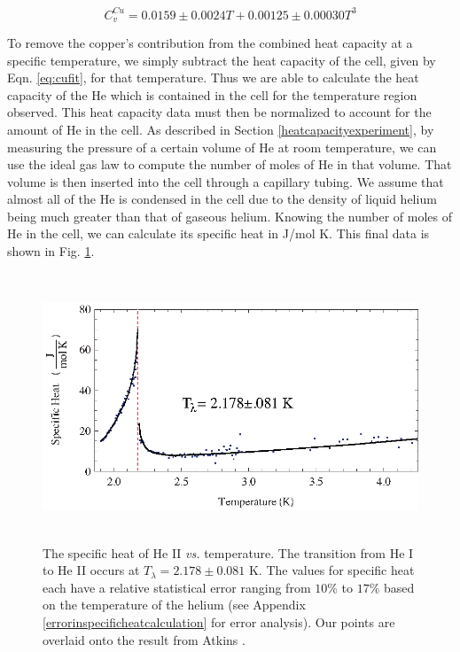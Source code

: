 \begin{center}
\begin{equation}\label{eq:cufit}
C^{Cu}_{v} = 0.0159\pm0.0024 T+ 0.00125\pm0.00030 T^{3} 
\end{equation}
\end{center}

To remove the copper's contribution from the combined heat capacity at a specific temperature, we simply subtract the heat capacity of the cell, given by Eqn. \ref{eq:cufit}, for that temperature. Thus we are able to calculate the heat capacity of the He which is contained in the cell for the temperature region observed.  This heat capacity data must then be normalized to account for the amount of He in the cell. As described in Section \ref{heatcapacityexperiment}, by measuring the pressure of a certain volume of He at room temperature, we can use the ideal gas law to compute the number of moles of He in that volume.  That volume is then inserted into the cell through a capillary tubing.  We assume that almost all of the He is condensed in the cell due to the density of liquid helium being much greater than that of gaseous helium.  Knowing the number of moles of He in the cell, we can calculate its specific heat in J/mol K. This final data is shown in Fig. \ref{fig:lambdatrans}.

\begin{figure}[htbp]
\begin{center}
\includegraphics[height=80mm]{./figures/lambdatrans.eps}
\caption{\small{The specific heat of He II \emph{vs.} temperature. The transition from He I to He II occurs at $T_{\lambda} = 2.178 \pm 0.081$ K.  The values for specific heat each have a relative statistical error ranging from $10\%$  to $17\%$ based on the temperature of the helium (see Appendix \ref{errorinspecificheatcalculation} for error analysis). Our points are overlaid onto the result from Atkins \cite{atkins}.}}
\label{fig:lambdatrans}
\end{center}
\end{figure}

